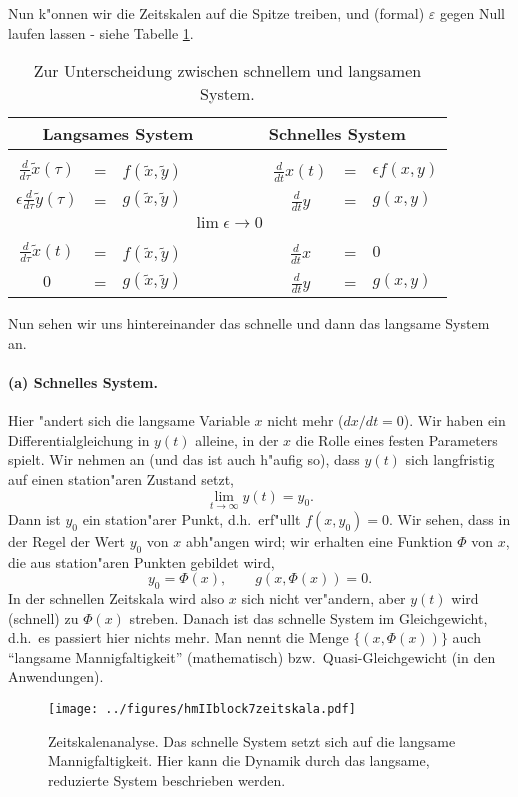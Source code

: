 Nun k"onnen wir die Zeitskalen auf die Spitze treiben, und (formal) $\varepsilon$ gegen Null laufen lassen - siehe
Tabelle \ref{epsnulltabelleeins}.
\begin{table}[h]
\caption{\label{epsnulltabelleeins} Zur Unterscheidung zwischen schnellem und langsamen System.}
\begin{center}
\begin{tabular}{ccl|ccl}
\multicolumn{3}{c|}{Langsames System}&
\multicolumn{3}{c}{Schnelles System}\\
\hline
$\quad$& & $\quad$ & & \\
$\frac d {d\tau} \tilde x(\tau)$ & =  & $f(\tilde x,\tilde y)$ $\qquad$&$\qquad$
   $ \frac d {d t}  x(t)$ & = & $\epsilon f(x,y)$\\
$\epsilon \frac d {d\tau} \tilde y(\tau)$ & = & $ g(\tilde x, \tilde y)$&$\qquad$
        $ \frac d {d t}y $ & =  & $g(x,y)$\\
\multicolumn{6}{c}{$\lim \epsilon\rightarrow 0$} \\
$\quad$& & $\quad$ & & \\
$\frac d {d \tau} \tilde x(t)$ & =  & $f(\tilde x,\tilde y)$ $\qquad$&$\qquad$
   $ \frac d {d t} x$ & = & $0$\\
$ 0$ & = & $ g(\tilde x,\tilde y)$&$\qquad$
        $ \frac d {dt} y $ & =  & $g(x, y)$
\end{tabular}
\end{center}
\end{table}
Nun sehen wir uns hintereinander das schnelle und dann das langsame System an.

\paragraph{\bf (a) Schnelles System.} Hier "andert sich die langsame Variable $x$ 
nicht mehr ($dx/dt=0$). Wir haben ein Differentialgleichung in $y(t)$ alleine, 
in der $x$ die Rolle eines festen Parameters spielt. Wir nehmen an
(und das ist auch h"aufig so), dass $y(t)$ sich langfristig auf einen station"aren 
Zustand setzt,
$$ \lim_{t\rightarrow\infty} y(t) = y_0.$$
Dann ist $y_0$ ein station"arer Punkt, d.h.\ erf"ullt $f(x,y_0)=0$. Wir sehen, 
dass in der Regel 
der Wert $y_0$ von $x$ abh"angen wird; wir erhalten 
eine Funktion $\Phi$ von $x$, 
die aus station"aren Punkten gebildet wird,
$$ y_0 = \Phi(x), \qquad g(x,\Phi(x))=0.$$
In der schnellen Zeitskala wird also $x$ sich nicht ver"andern, 
aber $y(t)$ wird (schnell) zu $\Phi(x)$ streben.
Danach ist das schnelle System im Gleichgewicht, d.h.\ es passiert hier nichts mehr. Man nennt
die Menge $\{(x,\Phi(x))\}$ auch ``langsame Mannigfaltigkeit'' (mathematisch) bzw.\ Quasi-Gleichgewicht
(in den Anwendungen).
\begin{figure}[htbp] %
   \centering
   \texttt{[image: ../figures/hmIIblock7zeitskala.pdf]}
   \caption{Zeitskalenanalyse. Das schnelle System setzt sich auf die langsame Mannigfaltigkeit.
Hier kann die Dynamik durch das langsame, reduzierte System beschrieben werden.}
   \label{rk:mm:sing}
\end{figure}

